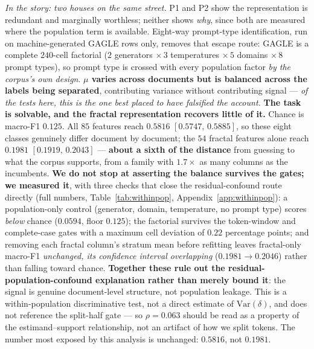 \documentclass{article}
\newcommand{\ci}[2]{{\scriptsize$[#1,\,#2]$}}
\begin{document}
\emph{In the story: two houses on the same street.} P1 and P2 show the
representation is redundant and marginally worthless; neither shows
\emph{why}, since both are measured where the population term is available.
Eight-way prompt-type identification, run on machine-generated GAGLE rows
only, removes that escape route: GAGLE is a complete $240$-cell factorial
($2$ generators $\times\,3$ temperatures $\times\,5$ domains $\times\,8$
prompt types), so prompt type is crossed with every population factor
\emph{by the corpus's own design}. \textbf{$\mu$ varies across documents but
is balanced across the labels being separated}, contributing variance
without contributing signal --- \emph{of the tests here, this is the one
best placed to have falsified the account.}
\textbf{The task is solvable, and the fractal representation recovers little of
it.} Chance is macro-F1 $0.125$. All $85$ features reach $0.5816$
\ci{0.5747}{0.5885}, so these eight classes genuinely differ document by
document; the $54$ fractal features alone reach $0.1981$ \ci{0.1919}{0.2043}
--- \textbf{about a sixth of the distance} from guessing to what the corpus
supports, from a family with $1.7\times$ as many columns as the incumbents.
\textbf{We do not stop at asserting the balance survives the gates; we
measured it}, with three checks that close the residual-confound route
directly (full numbers, Table~\ref{tab:withinpop}, Appendix~\ref{app:withinpop}):
a population-only control (generator, domain, temperature, no prompt type)
scores \emph{below} chance ($0.0594$, floor $0.125$); the factorial survives
the token-window and complete-case gates with a maximum cell deviation of
$0.22$ percentage points; and removing each fractal column's stratum mean
before refitting leaves fractal-only macro-F1 \emph{unchanged, its confidence
interval overlapping} ($0.1981\to0.2046$) rather than falling toward chance.
\textbf{Together these rule out the residual-population-confound explanation
rather than merely bound it}: the signal is genuine document-level structure,
not population leakage. This is a within-population discriminative test, not a
direct estimate of $\mathrm{Var}(\delta)$, and does not reference the
split-half gate --- so $\rho=0.063$ should be read as a property of the
estimand--support relationship, not an artifact of how we split tokens. The
number most exposed by this analysis is unchanged: $0.5816$, not $0.1981$.
\end{document}
